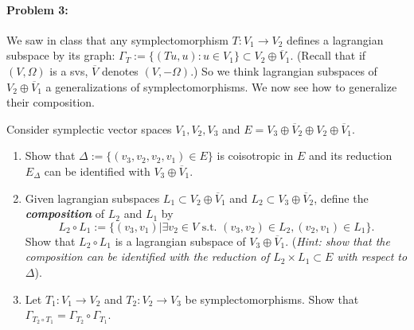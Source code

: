 \paragraph{Problem 3:}  We saw in class that any symplectomorphism $T:V_1\to V_2$ defines a lagrangian subspace by its graph: $\Gamma_{T}:=\{(Tu,u):u\in V_1 \}\subset V_2\oplus \overline{V}_{1}$. (Recall that if $(V,\Omega)$ is a svs,  $\overline{V}$ denotes $(V,-\Omega)$.) So we think lagrangian subspaces of $V_2\oplus \overline{V}_{1}$ a generalizations of symplectomorphisms. We now see how to generalize their composition. 

Consider symplectic vector spaces  $V_1,V_2,V_3$ and $E=V_3\oplus \overline{ V}_{2}\oplus V_2\oplus \overline{V}_1$.
\begin{enumerate}[label=\alph*.]
	\item Show that $\Delta :=\{(v_3,v_2,v_2,v_1)\in E\} $ is coisotropic in $E$ and its reduction $E_{\Delta}$ can be identified with $V_3\oplus \overline{V}_{1}$.

	\item Given lagrangian subspaces $L_1\subset V_2\oplus \overline{V}_{1}$ and $L_2\subset  V_3\oplus \overline{V}_{2}$, define the \textit{\textbf{composition}} of $L_2$ and $L_1$ by
		\[L_2\circ L_1:=\{(v_3,v_1)|\exists v_2\in V\text{ s.t. } (v_3,v_2)\in L_2,(v_2,v_1)\in L_1\}. \]
		Show that $L_2\circ L_1$ is a lagrangian subspace of $V_3\oplus \overline{V}_{1}$. (\textit{Hint: show that the composition can be identified with the reduction of $L_2\times L_1\subset E$ with respect to $\Delta$}).

	\item Let $T_1:V_1\to V_2$ and  $T_2:V_2\to V_3$ be symplectomorphisms. Show that $\Gamma_{T_2\circ T_1}=\Gamma_{T_2}\circ \Gamma_{T_1}$.
\end{enumerate}

